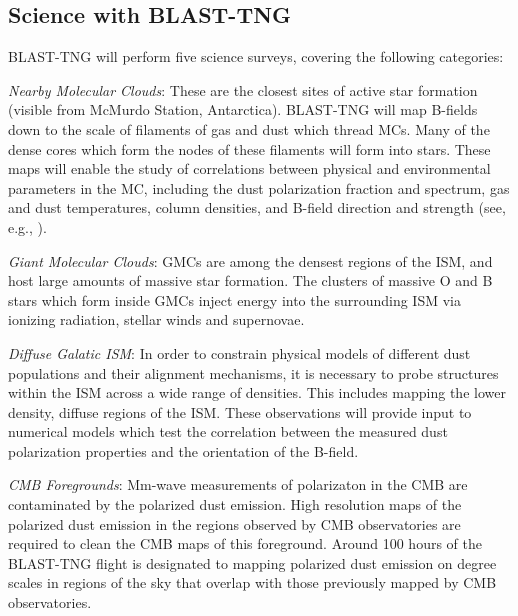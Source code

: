 {\subsection{Science with BLAST-TNG}

BLAST-TNG will perform five science surveys, covering the following categories:

\vspace{5mm}

\textit{Nearby Molecular Clouds}: These are the closest sites of active star formation (visible from McMurdo Station, Antarctica). BLAST-TNG will map B-fields down to the scale of filaments of gas and dust which thread MCs. Many of the dense cores which form the nodes of these filaments will form into stars. These maps will enable the study of correlations between physical and environmental parameters in the MC, including the dust polarization fraction and spectrum, gas and dust temperatures, column densities, and B-field direction and strength (see, e.g., \citet{galitzki2014balloon,fissel2016balloon,fissel2018relative,shariff2019submillimeter,gandilo2016submillimeter}).

\vspace{5mm}

\textit{Giant Molecular Clouds}: GMCs are among the densest regions of the ISM, and host large amounts of massive star formation. The clusters of massive O and B stars which form inside GMCs inject energy into the surrounding ISM via ionizing radiation, stellar winds and supernovae.
\vspace{5mm}

\textit{Diffuse Galatic ISM}: In order to constrain physical models of different dust populations and their alignment mechanisms, it is necessary to probe structures within the ISM across a wide range of densities. This includes mapping the lower density, diffuse regions of the ISM. These observations will provide input to numerical models which test the correlation between the measured dust polarization properties and the orientation of the B-field.

\vspace{5mm}

\textit{CMB Foregrounds}: Mm-wave measurements of polarizaton in the CMB are contaminated by the polarized dust emission. High resolution maps of the polarized dust emission in the regions observed by CMB observatories are required to clean the CMB maps of this foreground. Around 100 hours of the BLAST-TNG flight is designated to mapping polarized dust emission on degree scales in regions of the sky that overlap with those previously mapped by CMB observatories.

}
